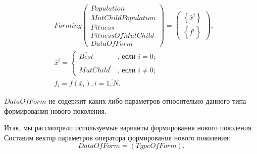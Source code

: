\begin{align}
\label{StandardGA:eq:OnlyOffspringWithBestGenerationForming2}
&Forming \left( \begin{array}{c} Population\\MutChildPopulation\\Fitness\\FitnessOfMutChild\\DataOfForm\end{array}\right) =\left( \begin{array}{c} \left\lbrace \bar{x}^i\right\rbrace \\\left\lbrace f^i\right\rbrace\end{array}\right),\\&\bar{x}^i=\left\lbrace \begin{aligned}
\overline{Best}&\text{, если }i=0; \\ \overline{MutChild}^i&\text{, если }i\neq 0;
\end{aligned}\right.\nonumber\\
&f_i=f\left( \bar{x}_i\right), i=\overline{1,N}.\nonumber
\end{align}

$ DataOfForm $ не содержит каких-либо параметров относительно данного типа формирования нового поколения.

Итак, мы рассмотрели используемые варианты формирования нового поколения. Составим вектор параметров оператора формирования нового поколения:
\begin{equation}
\label{StandardGA:eq:DataOfForm}
DataOfForm=\left( TypeOfForm\right) .
\end{equation}

\clearpage